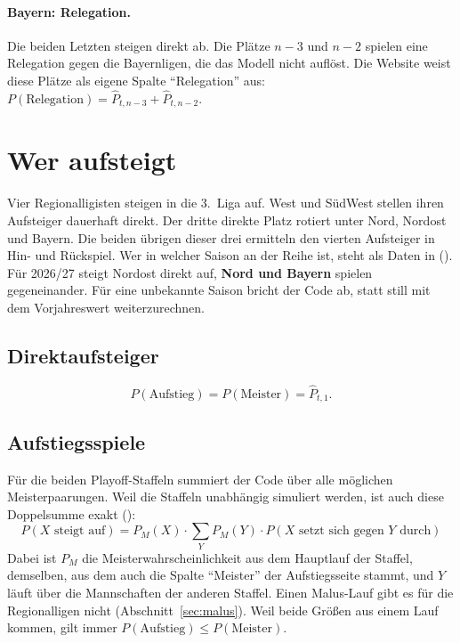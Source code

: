 \paragraph{Bayern: Relegation.} Die beiden Letzten steigen direkt ab. Die
Plätze $n-3$ und $n-2$ spielen eine Relegation gegen die Bayernligen, die das
Modell nicht auflöst. Die Website weist diese Plätze als eigene Spalte
\enquote{Relegation} aus:
$P(\text{Relegation}) = \hat P_{t,n-3} + \hat P_{t,n-2}$.

\section{Wer aufsteigt}

Vier Regionalligisten steigen in die 3.~Liga auf. West und SüdWest stellen
ihren Aufsteiger dauerhaft direkt. Der dritte direkte Platz rotiert unter
Nord, Nordost und Bayern. Die beiden übrigen dieser drei ermitteln den
vierten Aufsteiger in Hin- und Rückspiel. Wer in welcher Saison an der Reihe
ist, steht als Daten in 
(). Für 2026/27 steigt Nordost direkt auf,
\textbf{Nord und Bayern} spielen gegeneinander. Für eine unbekannte Saison
bricht der Code ab, statt still mit dem Vorjahreswert weiterzurechnen.

\subsection*{Direktaufsteiger}

\begin{equation}
  P(\text{Aufstieg}) = P(\text{Meister}) = \hat P_{t,1}.
\end{equation}

\subsection*{Aufstiegsspiele}

Für die beiden Playoff-Staffeln summiert der Code über alle möglichen
Meisterpaarungen. Weil die Staffeln unabhängig simuliert werden, ist auch
diese Doppelsumme exakt ():
\begin{equation}\label{eq:rl-aufstieg}
  \boxed{\;P(X \text{ steigt auf}) = P_M(X) \cdot \sum_{Y} P_M(Y)\cdot P(X \text{ setzt sich gegen } Y \text{ durch})\;}
\end{equation}
Dabei ist $P_M$ die Meisterwahrscheinlichkeit aus dem Hauptlauf der
Staffel, demselben, aus dem auch die Spalte \enquote{Meister} der
Aufstiegsseite stammt, und $Y$ läuft über die Mannschaften der anderen
Staffel. Einen Malus-Lauf gibt es für die Regionalligen nicht
(Abschnitt~\ref{sec:malus}). Weil beide Größen aus einem Lauf kommen, gilt
immer $P(\text{Aufstieg}) \le P(\text{Meister})$.

